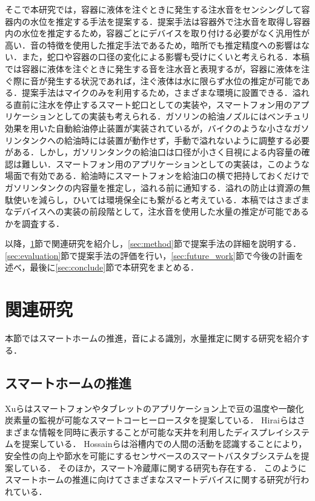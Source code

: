 \documentclass[submit,techrep,noauthor]{ipsj}
\begin{document}
そこで本研究では，容器に液体を注ぐときに発生する注水音をセンシングして容器内の水位を推定する手法を提案する．提案手法は容器外で注水音を取得し容器内の水位を推定するため，容器ごとにデバイスを取り付ける必要がなく汎用性が高い．音の特徴を使用した推定手法であるため，暗所でも推定精度への影響はない．また，蛇口や容器の口径の変化による影響も受けにくいと考えられる．本稿では容器に液体を注ぐときに発生する音を注水音と表現するが，容器に液体を注ぐ際に音が発生する状況であれば，注ぐ液体は水に限らず水位の推定が可能である．提案手法はマイクのみを利用するため，さまざまな環境に設置できる．溢れる直前に注水を停止するスマート蛇口としての実装や，スマートフォン用のアプリケーションとしての実装も考えられる．ガソリンの給油ノズルにはベンチュリ効果を用いた自動給油停止装置が実装されているが，バイクのような小さなガソリンタンクへの給油時には装置が動作せず，手動で溢れないように調整する必要がある．しかし，ガソリンタンクの給油口は口径が小さく目視による内容量の確認は難しい．スマートフォン用のアプリケーションとしての実装は，このような場面で有効である．給油時にスマートフォンを給油口の横で把持しておくだけでガソリンタンクの内容量を推定し，溢れる前に通知する．溢れの防止は資源の無駄使いを減らし，ひいては環境保全にも繋がると考えている．本稿ではさまざまなデバイスへの実装の前段階として，注水音を使用した水量の推定が可能であるかを調査する．\par

以降，\ref{sec:related}節で関連研究を紹介し，\ref{sec:method}節で提案手法の詳細を説明する．\ref{sec:evaluation}節で提案手法の評価を行い，\ref{sec:future_work}節で今後の計画を述べ，最後に\ref{sec:conclude}節で本研究をまとめる．

\section{関連研究}
\label{sec:related}
本節ではスマートホームの推進，音による識別，水量推定に関する研究を紹介する．

\subsection{スマートホームの推進}
Xuら\cite{smart_home1}はスマートフォンやタブレットのアプリケーション上で豆の温度や一酸化炭素量の監視が可能なスマートコーヒーロースタを提案している．
Hiraiら\cite{smart_home2}はさまざまな情報を同時に表示することが可能な天井を利用したディスプレイシステムを提案している．
Hossainら\cite{smart_home3}は浴槽内での人間の活動を認識することにより，安全性の向上や節水を可能にするセンサベースのスマートバスタブシステムを提案している．
そのほか，スマート冷蔵庫に関する研究\cite{smart_refrigerator1, smart_refrigerator2, smart_refrigerator3, smart_refrigerator4}も存在する．
このようにスマートホームの推進に向けてさまざまなスマートデバイスに関する研究が行われている．\par
\end{document}
